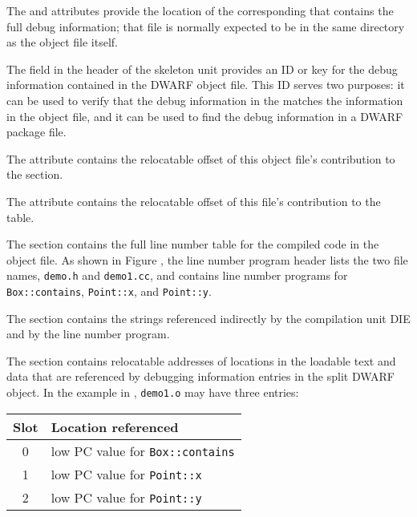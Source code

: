 The \DWATcompdir{} and \DWATdwoname{} attributes provide the
location of the corresponding \splitDWARFobjectfile{} that
contains the full debug information; that file is normally
expected to be in the same directory as the object file itself.

The \HFNdwoid{} field in the header of the skeleton unit provides 
an ID or key for the debug information contained in the 
DWARF object file. This ID serves
two purposes: it can be used to verify that the debug information
in the \splitDWARFobjectfile{} matches the information in the object
file, and it can be used to find the debug information in a DWARF
package file.

The \DWATaddrbase{} attribute contains the relocatable offset of
this object file's contribution to the \dotdebugaddr{} section.

The \DWATstmtlist{} attribute contains the relocatable offset of
this file's contribution to the \dotdebugline{} table.

The \dotdebugline{} section contains the full line number table for
the compiled code in the object file. As shown in
Figure , the line
number program header lists the two file names, \texttt{demo.h} and
\texttt{demo1.cc}, and contains line number programs for
\texttt{Box::contains}, \texttt{Point::x}, and \texttt{Point::y}.

The \dotdebugstr{} section contains the strings referenced indirectly
by the compilation unit DIE and by the line number program.

The \dotdebugaddr{} section contains relocatable addresses of
locations in the loadable text and data that are referenced by
debugging information entries in the split DWARF object. In the
example in , 
\texttt{demo1.o} may have three entries:
\par
\begin{nolinenumbersenv}
\begin{center}
\begin{tabular}{cl}
Slot & Location referenced \\
\hline
   0   &  low PC value for \texttt{Box::contains}  \\
   1   &  low PC value for \texttt{Point::x}       \\
   2   &  low PC value for \texttt{Point::y}       \\
\end{tabular}
\end{center}
\end{nolinenumbersenv}

